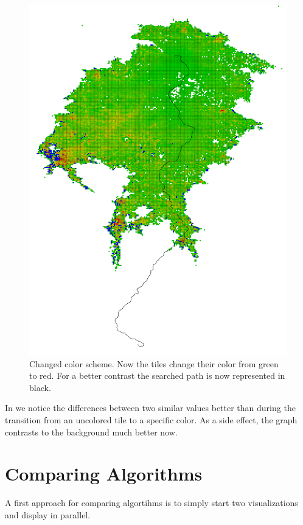 \documentclass
[
    paper = a4,
    pagesize,
    12 pt,
    oneside,                       %
    open = right,
    DIV = calc,
    BCOR = 0 mm,                   %
    bibtotoc
]
{scrbook}
\begin{document}
\begin{figure}
    \includegraphics[width=\textwidth]{Images/vis-hsv-cache.png}
\caption[]{Changed color scheme. Now the tiles change their color from green to red. For a better contrast the searched path is now represented in black.}
\label{fig:reload_coloring_hsv}
\end{figure}

In  we notice the differences between two similar values better than during the transition from an uncolored tile to a specific color.
As a side effect, the graph contrasts to the background much better now.

\section{Comparing Algorithms} \label{compare}
A first approach for comparing algortihms is to simply start two visualizations and display in parallel.
\end{document}
